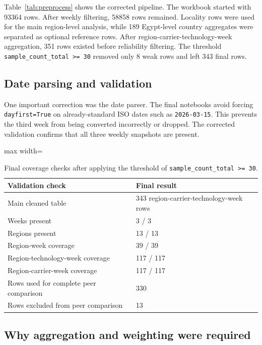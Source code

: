 \documentclass[12pt,a4paper]{article}
\begin{document}
Table~\ref{tab:preprocess} shows the corrected pipeline. The workbook started with \num{93364} rows. After weekly filtering, \num{58858} rows remained. Locality rows were used for the main region-level analysis, while 189 Egypt-level country aggregates were separated as optional reference rows. After region-carrier-technology-week aggregation, 351 rows existed before reliability filtering. The threshold \texttt{sample\_count\_total >= 30} removed only 8 weak rows and left 343 final rows.

\subsection{Date parsing and validation}

One important correction was the date parser. The final notebooks avoid forcing \texttt{dayfirst=True} on already-standard ISO dates such as \texttt{2026-03-15}. This prevents the third week from being converted incorrectly or dropped. The corrected validation confirms that all three weekly snapshots are present.

\begin{table}[htbp]
\centering
\begin{adjustbox}{max width=\textwidth}
\begin{tabular}{p{8cm}p{6cm}}
\toprule
Validation check & Final result \\
\midrule
Main cleaned table & 343 region-carrier-technology-week rows \\
Weeks present & 3 / 3 \\
Regions present & 13 / 13 \\
Region-week coverage & 39 / 39 \\
Region-technology-week coverage & 117 / 117 \\
Region-carrier-week coverage & 117 / 117 \\
Rows used for complete peer comparison & 330 \\
Rows excluded from peer comparison & 13 \\
\bottomrule
\end{tabular}
\end{adjustbox}
\caption{Final coverage checks after applying the threshold of \texttt{sample\_count\_total >= 30}.}
\label{tab:coverage}
\end{table}

\subsection{Why aggregation and weighting were required}
\end{document}
